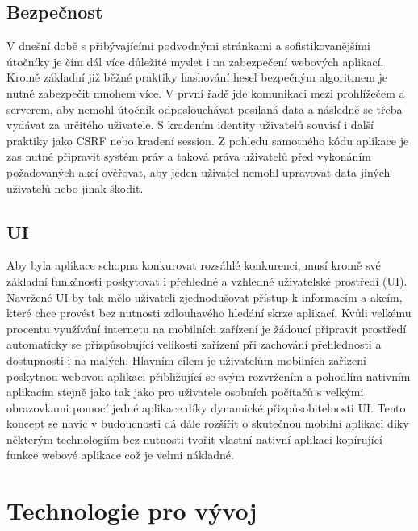 \begin{itemize}
\begin{itemize}
	\subsection{Bezpečnost}

	V dnešní době s přibývajícími podvodnými stránkami a sofistikovanějšími útočníky je čím dál více důležité myslet i
	na zabezpečení webových aplikací.
	Kromě základní již běžné praktiky hashování hesel bezpečným algoritmem je nutné zabezpečit mnohem více.
	V první řadě jde komunikaci mezi prohlížečem a serverem, aby nemohl útočník odposlouchávat posílaná data a následně
	se třeba vydávat za určitého uživatele.
	S kradením identity uživatelů souvisí i další praktiky jako CSRF nebo kradení session.
	Z pohledu samotného kódu aplikace je zas nutné připravit systém práv a taková práva uživatelů před vykonáním
	požadovaných akcí ověřovat, aby jeden uživatel nemohl upravovat data jiných uživatelů nebo jinak škodit.

	\subsection{UI}

	Aby byla aplikace schopna konkurovat rozsáhlé konkurenci, musí kromě své základní funkčnosti poskytovat i přehledné
	a vzhledné uživatelské prostředí (\noindent\ac{UI}).
	Navržené \ac{UI} by tak mělo uživateli zjednodušovat přístup k informacím a akcím, které chce provést bez nutnosti
	zdlouhavého hledání skrze aplikací.
	Kvůli velkému procentu využívání internetu na mobilních zařízení je žádoucí připravit prostředí automaticky se
	přizpůsobující velikosti zařízení při zachování přehlednosti a dostupnosti i na malých.
	Hlavním cílem je uživatelům mobilních zařízení poskytnou webovou aplikaci přibližující se svým rozvržením a pohodlím
	nativním aplikacím stejně jako tak jako pro uživatele osobních počítačů s velkými obrazovkami pomocí jedné
	aplikace díky dynamické přizpůsobitelnosti \ac{UI}.
	Tento koncept se navíc v budoucnosti dá dále rozšířit o skutečnou mobilní aplikaci díky některým technologiím
	bez nutnosti tvořit vlastní nativní aplikaci kopírující funkce webové aplikace což je velmi nákladné.

\section{Technologie pro vývoj}


\end{itemize}
\end{itemize}
